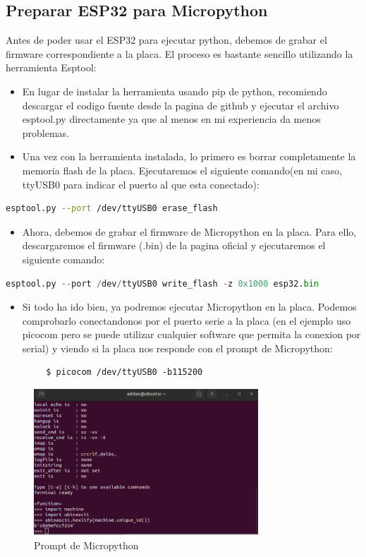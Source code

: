 \begin{titlepage}
\subsection{Preparar ESP32 para Micropython}
Antes de poder usar el ESP32 para ejecutar python, debemos de grabar el firmware correspondiente a la placa. El proceso es bastante sencillo utilizando la herramienta Esptool\cite{ref17}:
\begin{itemize}
	\item En lugar de instalar la herramienta usando pip de python, recomiendo descargar el codigo fuente desde la pagina de github\cite{ref18} y ejecutar el archivo esptool.py directamente ya que al menos en mi experiencia da menos problemas.
	\item Una vez con la herramienta instalada, lo primero es borrar completamente la memoria flash de la placa. Ejecutaremos el siguiente comando(en mi caso, ttyUSB0 para indicar el puerto al que esta conectado):
\end{itemize}
\begin{lstlisting}[language=Bash]
	esptool.py --port /dev/ttyUSB0 erase_flash
\end{lstlisting}
\begin{itemize}
	\item Ahora, debemos de grabar el firmware de Micropython en la placa. Para ello, descargaremos el firmware (.bin) de la pagina oficial\cite{ref19} y ejecutaremos el siguiente comando:
\end{itemize}
\begin{lstlisting}[language=python]
	esptool.py --port /dev/ttyUSB0 write_flash -z 0x1000 esp32.bin
\end{lstlisting}
\begin{itemize}
	\item Si todo ha ido bien, ya podremos ejecutar Micropython en la placa. Podemos comprobarlo conectandonos por el puerto serie a la placa (en el ejemplo uso picocom pero se puede utilizar cualquier software que permita la conexion por serial) y viendo si la placa nos responde con el prompt de Micropython:
\end{itemize}
	\begin{lstlisting}
		$ picocom /dev/ttyUSB0 -b115200
	\end{lstlisting}
	\begin{figure}[h!]
		\centering
		\includegraphics[width=0.75\textwidth]{imagenes/micropython_prompt.png}
		\caption{Prompt de Micropython}
	\end{figure}


\end{titlepage}
